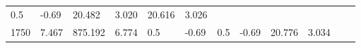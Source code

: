 \documentclass{article}
\begin{document}
\begin{longtable}[]{@{}llllllllllll@{}}
\begin{minipage}[t]{0.03\columnwidth}
0.5\strut
\end{minipage} & \begin{minipage}[t]{0.06\columnwidth}\raggedright\strut
-0.69\strut
\end{minipage} & \begin{minipage}[t]{0.06\columnwidth}\raggedright\strut
20.482\strut
\end{minipage} & \begin{minipage}[t]{0.08\columnwidth}\raggedright\strut
3.020\strut
\end{minipage} & \begin{minipage}[t]{0.06\columnwidth}\raggedright\strut
20.616\strut
\end{minipage} & \begin{minipage}[t]{0.09\columnwidth}\raggedright\strut
3.026\strut
\end{minipage}\tabularnewline
\begin{minipage}[t]{0.03\columnwidth}\raggedright\strut
1750\strut
\end{minipage} & \begin{minipage}[t]{0.06\columnwidth}\raggedright\strut
7.467\strut
\end{minipage} & \begin{minipage}[t]{0.06\columnwidth}\raggedright\strut
875.192\strut
\end{minipage} & \begin{minipage}[t]{0.08\columnwidth}\raggedright\strut
6.774\strut
\end{minipage} & \begin{minipage}[t]{0.03\columnwidth}\raggedright\strut
0.5\strut
\end{minipage} & \begin{minipage}[t]{0.06\columnwidth}\raggedright\strut
-0.69\strut
\end{minipage} & \begin{minipage}[t]{0.03\columnwidth}\raggedright\strut
0.5\strut
\end{minipage} & \begin{minipage}[t]{0.06\columnwidth}\raggedright\strut
-0.69\strut
\end{minipage} & \begin{minipage}[t]{0.06\columnwidth}\raggedright\strut
20.776\strut
\end{minipage} & \begin{minipage}[t]{0.08\columnwidth}\raggedright\strut
3.034\strut
\end{minipage} & \begin{minipage}[t]{0.06\columnwidth}\raggedright\strut

\end{minipage}
\end{longtable}
\end{document}
